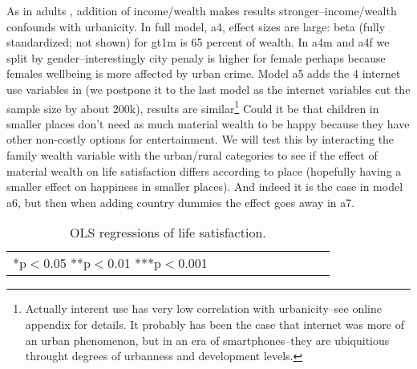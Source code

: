 \documentclass[10pt, letterpaper]{article}
\begin{document}
\begin{spacing}{1.4}
As in adults \citep{aok21}, addition of income/wealth makes results
stronger--income/wealth confounds with urbanicity.
In full model, a4, effect sizes are large: beta (fully standardized; not shown) for
gt1m is 65 percent of wealth.
 In a4m and a4f we split by gender--interestingly city penaly is higher for
female perhaps because females wellbeing is more affected by urban crime. 
 Model a5  adds the 4 internet use variables in  (we postpone it to
the last model as the internet variables cut the sample size by about 200k),
results are similar\footnote{Actually interent use has very low correlation
  with urbanicity--see online appendix for details. It probably has been the case
  that internet was more of an urban phenomenon, but in an era of
  smartphones--they are ubiquitious throught degrees of urbanness and
  development levels.}
Could it be that children in smaller places don't need as much material wealth
to be happy because they have other non-costly options for entertainment. We
 will test this by interacting the family wealth variable with the urban/rural
categories to see if the effect of material wealth on life satisfaction differs
according to place (hopefully having a smaller effect on happiness in smaller
places). And indeed it is the case in model a6, but then when adding country
dummies the effect goes away in a7. 


\begin{table}[H]\centering\caption{OLS regressions of life satisfaction.} \label{regA} \begin{scriptsize} \begin{tabular}{p{1.6in}p{.5in}p{.5in}p{.5in}p{.5in}|p{.5in}p{.5in}|p{.5in}|p{.5in}p{.5in}p{.5 in}p{.5in}p{.5 in}}\hline  \hline\multicolumn{4}{l}{*p$<$0.05 **p$<$0.01 ***p$<$0.001} \end{tabular}\end{scriptsize}\end{table}





\end{spacing}
\end{document}

